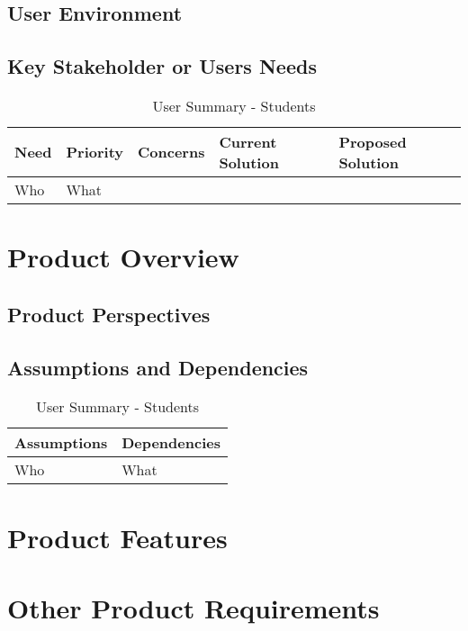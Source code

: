 \documentclass{article}
\begin{document}
\subsection{User Environment}

\subsection{Key Stakeholder or Users Needs}

\begin{table}[h!]
\begin{tabular}{|p{2.5cm}|p{2.5cm}|p{3.5cm}|p{3.5cm}|p{3.5cm}|}
\hline
\textbf{Need} & \textbf{Priority} & \textbf{Concerns} & \textbf{Current Solution} & \textbf{Proposed Solution}\\ \hline
Who & What & & &\\ \hline

\end{tabular}
\caption{User Summary - Students}
\label{table:4}
\end{table}

\section{Product Overview}

\subsection{Product Perspectives}

\subsection{Assumptions and Dependencies}

\begin{table}[h!]
\begin{center}
\begin{tabular}{|p{5.5cm}|p{6.5cm}|}
\hline
\textbf{Assumptions} & \textbf{Dependencies} \\ \hline
Who & What\\ \hline

\end{tabular}
\caption{User Summary - Students}
\label{table:4}
\end{center}
\end{table}


\section{Product Features}

\section{Other Product Requirements}
\end{document}
